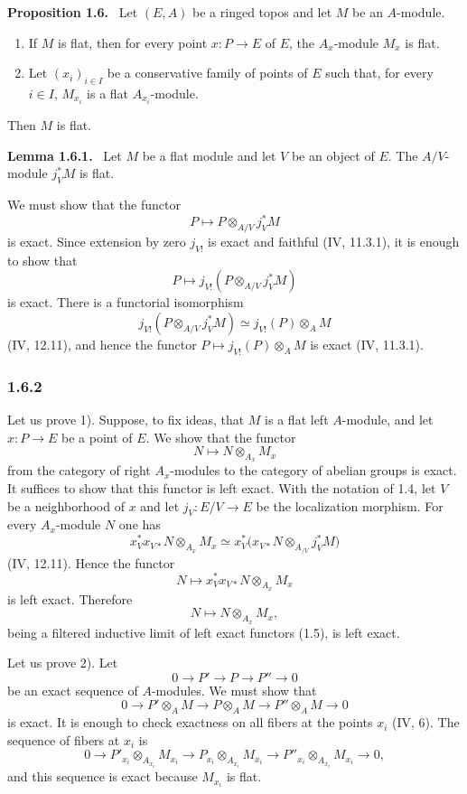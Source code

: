 \documentclass[11pt]{article}
\newenvironment{statement}[1]{\par\medskip\noindent\textbf{#1.}\ }{\par\medskip}
\begin{document}
\begin{statement}{Proposition 1.6}
Let $(E,A)$ be a ringed topos and let $M$ be an $A$-module.
\begin{enumerate}[label=\arabic*)]
\item If $M$ is flat, then for every point $x:P\to E$ of $E$, the $A_x$-module $M_x$ is flat.
\item Let $(x_i)_{i\in I}$ be a conservative family of points of $E$ such that, for every $i\in I$, $M_{x_i}$ is a flat $A_{x_i}$-module.
\end{enumerate}
Then $M$ is flat.
\end{statement}

\begin{statement}{Lemma 1.6.1}
Let $M$ be a flat module and let $V$ be an object of $E$. The $A/V$-module $j_V^*M$ is flat.
\end{statement}

We must show that the functor
\[
P\longmapsto P\otimes_{A/V}j_V^*M
\]
is exact. Since extension by zero $j_{V!}$ is exact and faithful (IV, 11.3.1), it is enough to show that
\[
P\longmapsto j_{V!}(P\otimes_{A/V}j_V^*M)
\]
is exact. There is a functorial isomorphism
\[
j_{V!}(P\otimes_{A/V}j_V^*M)\simeq j_{V!}(P)\otimes_A M
\]
(IV, 12.11), and hence the functor $P\mapsto j_{V!}(P)\otimes_A M$ is exact (IV, 11.3.1).

\subsubsection*{1.6.2}

Let us prove 1). Suppose, to fix ideas, that $M$ is a flat left $A$-module, and let $x:P\to E$ be a point of $E$. We show that the functor
\[
N\longmapsto N\otimes_{A_x}M_x
\]
from the category of right $A_x$-modules to the category of abelian groups is exact. It suffices to show that this functor is left exact. With the notation of 1.4, let $V$ be a neighborhood of $x$ and let $j_V:E/V\to E$ be the localization morphism. For every $A_x$-module $N$ one has
\[
x_V^*x_{V*}N\otimes_{A_x}M_x
\simeq
x_V^*\bigl(x_{V*}N\otimes_{A_{/V}}j_V^*M\bigr)
\]
(IV, 12.11). Hence the functor
\[
N\longmapsto x_V^*x_{V*}N\otimes_{A_x}M_x
\]
is left exact. Therefore
\[
N\longmapsto N\otimes_{A_x}M_x,
\]
being a filtered inductive limit of left exact functors (1.5), is left exact.

Let us prove 2). Let
\[
0\longrightarrow P'\longrightarrow P\longrightarrow P''\longrightarrow 0
\]
be an exact sequence of $A$-modules. We must show that
\[
0\longrightarrow P'\otimes_A M\longrightarrow P\otimes_A M
\longrightarrow P''\otimes_A M\longrightarrow 0
\]
is exact. It is enough to check exactness on all fibers at the points $x_i$ (IV, 6). The sequence of fibers at $x_i$ is
\[
0\longrightarrow P'_{x_i}\otimes_{A_{x_i}}M_{x_i}
\longrightarrow P_{x_i}\otimes_{A_{x_i}}M_{x_i}
\longrightarrow P''_{x_i}\otimes_{A_{x_i}}M_{x_i}
\longrightarrow 0,
\]
and this sequence is exact because $M_{x_i}$ is flat.
\end{document}
